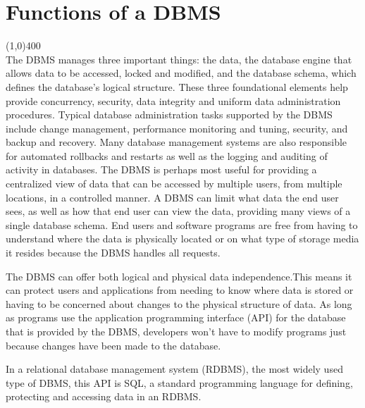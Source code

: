 \documentclass{article}
\begin{document}
\section{Functions of a DBMS}
\line(1,0){400}\\
The DBMS manages three important things: the data, the database engine that allows data to be accessed, locked and modified, and the database schema, which defines the database's logical structure. These three foundational elements help provide concurrency, security, data integrity and uniform data administration procedures. Typical database administration tasks supported by the DBMS include change management, performance monitoring and tuning, security, and backup and recovery. Many database management systems are also responsible for automated rollbacks and restarts as well as the logging and auditing of activity in databases.
The DBMS is perhaps most useful for providing a centralized view of data that can be accessed by multiple users, from multiple locations, in a controlled manner. A DBMS can limit what data the end user sees, as well as how that end user can view the data, providing many views of a single database schema. End users and software programs are free from having to understand where the data is physically located or on what type of storage media it resides because the DBMS handles all requests.

The DBMS can offer both logical and physical data independence.This means it can protect users and applications from needing to know where data is stored or having to be concerned about changes to the physical structure of data. As long as programs use the application programming interface (API) for the database that is provided by the DBMS, developers won't have to modify programs just because changes have been made to the database.

In a relational database management system (RDBMS), the most widely used type of DBMS, this API is SQL, a standard programming language for defining, protecting and accessing data in an RDBMS.
\end{document}
